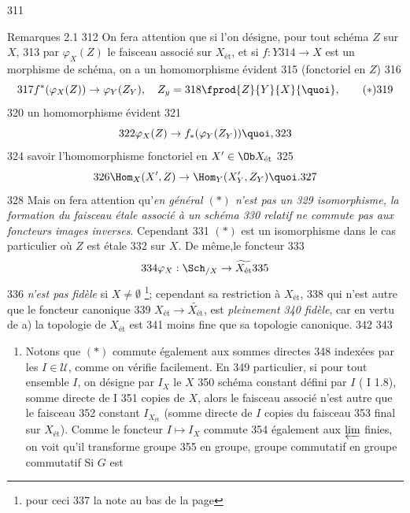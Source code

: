    311	\begin{enonce*}[remark]{Remarques 2.1}
   312	On fera attention que si l'on désigne, pour tout schéma $Z$ sur $X$,
   313	par $\varphi_{X} (Z)$ le faisceau associé sur $X_{\text{ét}}$, et si $f : Y
   314	\to X$ est un morphisme de schéma, on a un homomorphisme évident
   315	(fonctoriel en $Z$)
   316	\begin{equation*}
   317	f^{\ast} (\varphi_X (Z)) \to \varphi_Y (Z_Y),\quad Z_y =
   318	\fprod{Z}{Y}{X}{\quoi},\tag{$\ast$}
   319	\end{equation*}
   320	\ie un homomorphisme évident
   321	$$
   322	\varphi_X (Z) \to f_{\ast} (\varphi_Y (Z_Y)){\quoi},
   323	$$
   324	savoir l'homomorphisme fonctoriel en $X'\in \Ob X_{\text{ét}}$
   325	$$
   326	\Hom_X (X', Z) \to \Hom_Y (X'_{Y}, Z_{Y}){\quoi}.
   327	$$
   328	Mais on fera attention qu'\emph{en général $(\ast)$ n'est pas un
   329	isomorphisme, \ie la formation du faisceau étale associé à un schéma
   330	relatif ne commute pas aux foncteurs images inverses}. Cependant
   331	$(\ast)$ est un isomorphisme dans le cas particulier où $Z$ est étale
   332	sur $X$. De même,\pageoriginale le foncteur
   333	$$
   334	\varphi_{X} : \Sch_{/X} \to \widetilde{X_{\text{ét}}}
   335	$$
   336	\emph{n'est pas fidèle} si $X \neq ∅$ \footnote{\Cf pour ceci
   337	  la note au bas de la page }; cependant sa restriction à $X_{\text{ét}}$,
   338	qui n'est autre que le foncteur canonique
   339	$X_{\text{ét}}\to \widetilde{X_{\text{ét}}}$, est \emph{pleinement
   340	  fidèle}, car en vertu de a) la topologie de $X_{\text{ét}}$ est
   341	moins fine que sa topologie canonique.
   342	
   343	\begin{enumerate}
   344	\renewcommand{\theenumi}{\alph{enumi}}
   345	\renewcommand{\labelenumi}{\theenumi)}
   346	\setcounter{enumi}{1}
   347	\item Notons que $(\ast)$ commute également aux sommes directes
   348	  indexées par les $I \in 𝒰$, comme on vérifie facilement. En
   349	  particulier, si pour tout ensemble $I$, on désigne par $I_{X}$ le $X$
   350	  schéma constant défini par $I$ ( I 1.8), somme directe de I
   351	  copies de $X$, alors le faisceau associé n'est autre que le faisceau
   352	  constant $I_{X_{\text{ét}}}$ (somme directe de $I$ copies du  faisceau
   353	  final sur $X_{\text{ét}}$). Comme le foncteur $I \mapsto I_X$ commute
   354	  également aux $\varprojlim$ finies, on voit qu'il transforme groupe
   355	  en groupe, groupe commutatif en groupe commutatif \etc Si $G$ est

\end{enumerate}
\end{enonce*}
